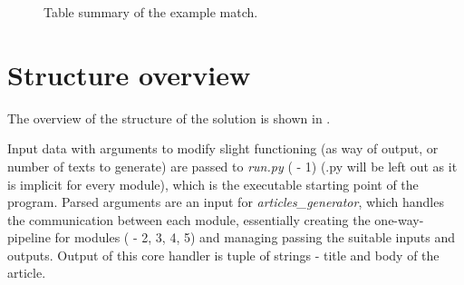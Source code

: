 \begin{figure}[p]
	\caption{Table summary of the example match.}
	\label{fig:overview}
\end{figure}

\section{Structure overview}
The overview of the structure of the solution is shown in .

Input data with arguments to modify slight functioning (as way of output, or number of texts to generate) are passed to \emph{run.py} ( - 1) (.py will be left out as it is implicit for every module), which is the executable starting point of the program. Parsed arguments are an input for \emph{articles\_generator}, which handles the communication between each module, essentially creating the one-way-pipeline for modules ( - 2, 3, 4, 5) and managing passing the suitable inputs and outputs. Output of this core handler is tuple of strings - title and body of the article.

